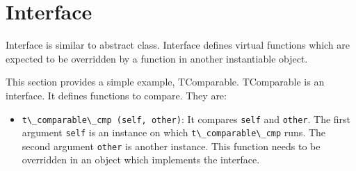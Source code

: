 \section{Interface}\label{interface}

Interface is similar to abstract class. Interface defines virtual
functions which are expected to be overridden by a function in another
instantiable object.

This section provides a simple example, TComparable. TComparable is an
interface. It defines functions to compare. They are:

\begin{itemize}
\tightlist
\item
  \passthrough{\lstinline!t\_comparable\_cmp (self, other)!}: It
  compares \passthrough{\lstinline!self!} and
  \passthrough{\lstinline!other!}. The first argument
  \passthrough{\lstinline!self!} is an instance on which
  \passthrough{\lstinline!t\_comparable\_cmp!} runs. The second argument
  \passthrough{\lstinline!other!} is another instance. This function
  needs to be overridden in an object which implements the interface.


\end{itemize}
